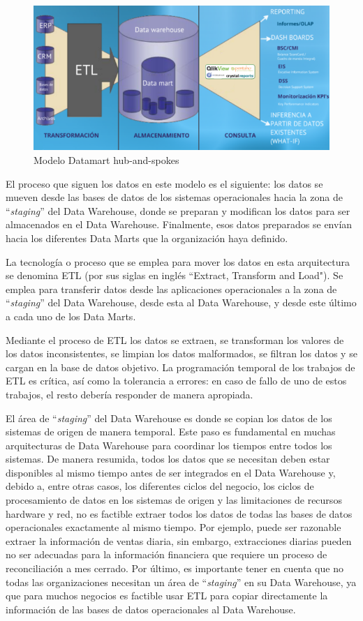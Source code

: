 \documentclass[a4paper, 12pt]{book}
\begin{document}
\begin{figure}
   \centering
   \includegraphics[width=12cm, keepaspectratio]{img/modelo_Datamart}
   \caption{Modelo Datamart hub-and-spokes}
   \label{fig:modelo_Datamart}
\end{figure}

El proceso que siguen los datos en este modelo es el siguiente: los datos se mueven desde las bases de datos de los sistemas operacionales hacia la zona de “\textit{staging}” del Data Warehouse, donde se preparan y modifican los datos para ser almacenados en el Data Warehouse. Finalmente, esos datos preparados se envían hacia los diferentes Data Marts que la organización haya definido. 

La tecnología o proceso que se emplea para mover los datos en esta arquitectura se denomina ETL (por sus siglas en inglés ``Extract, Transform and Load"). Se emplea para transferir datos desde las aplicaciones operacionales a la zona de “\textit{staging}” del Data Warehouse, desde esta al Data Warehouse, y desde este último a cada uno de los Data Marts.

Mediante el proceso de ETL los datos se extraen, se transforman los valores de los datos inconsistentes, se limpian los datos malformados, se filtran los datos y se cargan en la base de datos objetivo. La programación temporal de los trabajos de ETL es crítica, así como la tolerancia a errores: en caso de fallo de uno de estos trabajos, el resto debería responder de manera apropiada.

El área de “\textit{staging}” del Data Warehouse es donde se copian los datos de los sistemas de origen de manera temporal. Este paso es fundamental en muchas arquitecturas de Data Warehouse para coordinar los tiempos entre todos los sistemas. De manera resumida, todos los datos que se necesitan deben estar disponibles al mismo tiempo antes de ser integrados en el Data Warehouse y, debido a, entre otras casos, los diferentes ciclos del negocio, los ciclos de procesamiento de datos en los sistemas de origen y las limitaciones de recursos hardware y red, no es factible extraer todos los datos de todas las bases de datos operacionales exactamente al mismo tiempo. Por ejemplo, puede ser razonable extraer la información de ventas diaria, sin embargo, extracciones diarias pueden no ser adecuadas para la información financiera que requiere un proceso de reconciliación a mes cerrado. Por último, es importante tener en cuenta que no todas las organizaciones necesitan un área de “\textit{staging}” en su Data Warehouse, ya que para muchos negocios es factible usar ETL para copiar directamente la información de las bases de datos operacionales al Data Warehouse.
\end{document}
